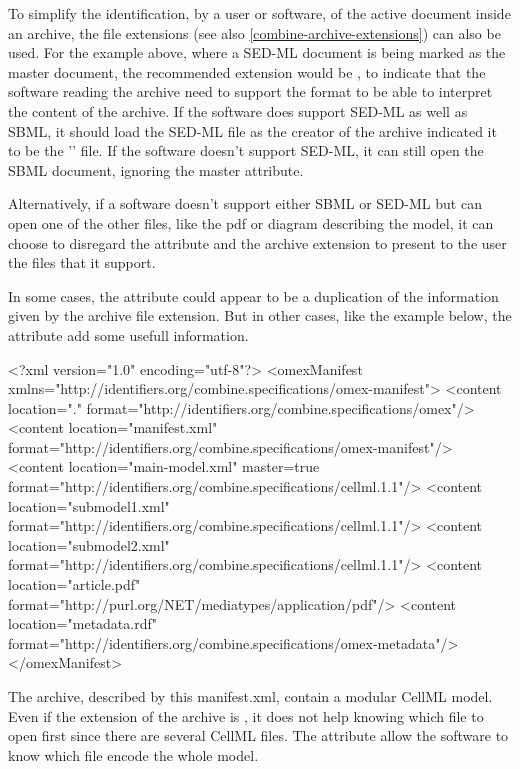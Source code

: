 To simplify the identification, by a user or software, of the active document inside an archive, the file extensions 
(see also \ref{combine-archive-extensions}) can also be used. For the example above, 
where a SED-ML document is being marked as the master document, the 
recommended extension would be , to indicate that the software reading the archive need
to support the  format to be able to interpret the content of the archive. If the software
does support SED-ML as well as SBML, it should load the SED-ML file as the creator of the archive indicated
it to be the '' file. If the software doesn't support SED-ML, it can still open the SBML document, ignoring
the master attribute.

Alternatively, if a software doesn't support either SBML or SED-ML but can open one of the other files, like the pdf
or diagram describing the model, it can choose to disregard the  attribute and the archive extension to present to the user the
files that it support.

In some cases, the  attribute could appear to be a duplication of the information given by the archive file
extension. But in other cases, like the example below, the  attribute add some usefull information.


\begin{example}
<?xml version="1.0" encoding="utf-8"?>
<omexManifest xmlns="http://identifiers.org/combine.specifications/omex-manifest">
    <content location="." format="http://identifiers.org/combine.specifications/omex"/>
    <content location="manifest.xml" 
        format="http://identifiers.org/combine.specifications/omex-manifest"/>
    <content location="main-model.xml" master=true 
        format="http://identifiers.org/combine.specifications/cellml.1.1"/>
    <content location="submodel1.xml" 
        format="http://identifiers.org/combine.specifications/cellml.1.1"/>
    <content location="submodel2.xml" 
        format="http://identifiers.org/combine.specifications/cellml.1.1"/>
    <content location="article.pdf" format="http://purl.org/NET/mediatypes/application/pdf"/>
    <content location="metadata.rdf"
        format="http://identifiers.org/combine.specifications/omex-metadata"/>
</omexManifest>
\end{example}

The archive, described by this manifest.xml, contain a modular CellML model. Even if the extension of the archive is , it
does not help knowing which file to open first since there are several CellML files. The  attribute allow the software
to know which file encode the whole model.


